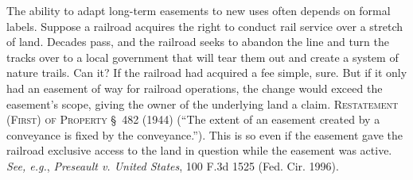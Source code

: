 
\item
The ability to adapt long-term easements to new uses often depends on formal
labels. Suppose a railroad acquires the right to conduct rail service over a
stretch of land. Decades pass, and the railroad seeks to abandon the line and
turn the tracks over to a local government that will tear them out and create a
system of nature trails. Can it? If the railroad had acquired a fee simple,
sure. But if it only had an easement of way for railroad operations, the change
would exceed the easement's scope, giving the owner of the underlying land a
claim. \textsc{Restatement (First) of Property} \S~482 (1944) (``The extent of
an easement created by a conveyance is fixed by the conveyance.''). This is so
even if the easement gave the railroad exclusive access to the land in question
while the easement was active. \textit{See, e.g.}, \emph{Preseault v. United
States}, 100 F.3d 1525 (Fed. Cir. 1996). 

